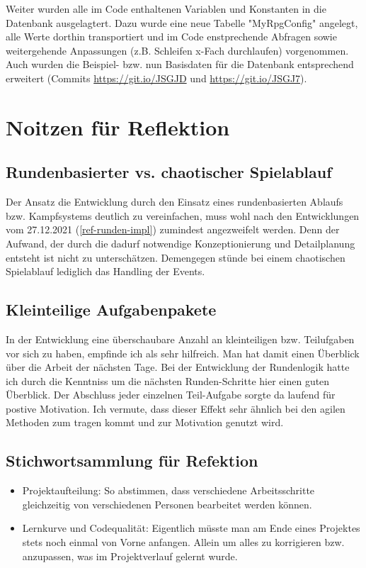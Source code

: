 Weiter wurden alle im Code enthaltenen Variablen und Konstanten in die Datenbank ausgelagtert. Dazu wurde eine neue Tabelle "MyRpgConfig" angelegt, alle Werte dorthin transportiert und im Code enstprechende Abfragen sowie weitergehende Anpassungen (z.B. Schleifen x-Fach durchlaufen) vorgenommen. Auch wurden die Beispiel- bzw. nun Basisdaten für die Datenbank entsprechend erweitert (Commits \url{https://git.io/JSGJD} und \url{https://git.io/JSGJ7}).



\section{Noitzen für Reflektion}

\subsection{Rundenbasierter vs. chaotischer Spielablauf}

Der Ansatz die Entwicklung durch den Einsatz eines rundenbasierten Ablaufs bzw. Kampfsystems deutlich zu vereinfachen, muss wohl nach den Entwicklungen vom 27.12.2021 (\ref{ref-runden-impl}) zumindest angezweifelt werden. Denn der Aufwand, der durch die dadurf notwendige Konzeptionierung und Detailplanung entsteht ist nicht zu unterschätzen. Demengegen stünde bei einem chaotischen Spielablauf lediglich das Handling der Events. 

\subsection{Kleinteilige Aufgabenpakete} 

In der Entwicklung eine überschaubare Anzahl an kleinteiligen bzw. Teilufgaben vor sich zu haben, empfinde ich als sehr hilfreich. Man hat damit einen Überblick über die Arbeit der nächsten Tage. Bei der Entwicklung der Rundenlogik hatte ich durch die Kenntniss um die nächsten Runden-Schritte hier einen guten Überblick. Der Abschluss jeder einzelnen Teil-Aufgabe sorgte da laufend für postive Motivation. 
Ich vermute, dass dieser Effekt sehr ähnlich bei den agilen Methoden zum tragen kommt und zur Motivation genutzt wird. 

\subsection{Stichwortsammlung für Refektion}

\begin{itemize}
    \item Projektaufteilung: So abstimmen, dass verschiedene Arbeitsschritte gleichzeitig von verschiedenen Personen bearbeitet werden können.  
    \item Lernkurve und Codequalität: Eigentlich müsste man am Ende eines Projektes stets noch einmal von Vorne anfangen. Allein um alles zu korrigieren bzw. anzupassen, was im Projektverlauf gelernt wurde.
\end{itemize}


